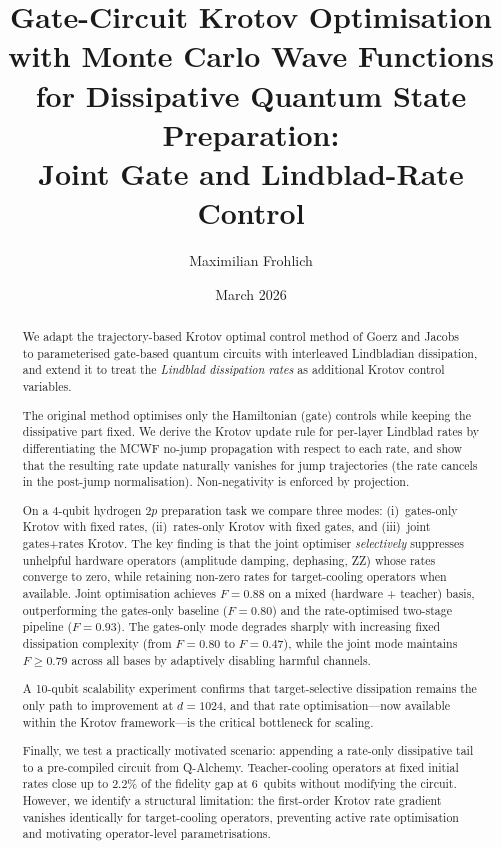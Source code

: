 \documentclass[11pt,a4paper]{article}
\title{Gate-Circuit Krotov Optimisation with Monte Carlo Wave Functions\\
for Dissipative Quantum State Preparation:\\
Joint Gate and Lindblad-Rate Control}
\author{Maximilian Frohlich}
\date{March 2026}
\begin{document}
\maketitle

\begin{abstract}
We adapt the trajectory-based Krotov optimal control method of Goerz and
Jacobs~\cite{goerz2018} to parameterised gate-based quantum circuits with
interleaved Lindbladian dissipation, and extend it to treat the
\emph{Lindblad dissipation rates} as additional Krotov control variables.

The original method optimises only the Hamiltonian (gate) controls while
keeping the dissipative part fixed.  We derive the Krotov update rule for
per-layer Lindblad rates by differentiating the MCWF no-jump propagation
with respect to each rate, and show that the resulting rate update
naturally vanishes for jump trajectories (the rate cancels in the
post-jump normalisation).  Non-negativity is enforced by projection.

On a 4-qubit hydrogen $2p$ preparation task we compare three modes:
(i)~gates-only Krotov with fixed rates, (ii)~rates-only Krotov with
fixed gates, and (iii)~joint gates+rates Krotov.  The key finding is that
the joint optimiser \emph{selectively} suppresses unhelpful hardware
operators (amplitude damping, dephasing, ZZ) whose rates converge to zero,
while retaining non-zero rates for target-cooling operators when available.
Joint optimisation achieves $F = 0.88$ on a mixed (hardware + teacher)
basis, outperforming the gates-only baseline ($F = 0.80$) and the
rate-optimised two-stage pipeline ($F = 0.93$).  The gates-only mode
degrades sharply with increasing fixed dissipation complexity
(from $F = 0.80$ to $F = 0.47$), while the joint mode maintains
$F \ge 0.79$ across all bases by adaptively disabling harmful channels.

A 10-qubit scalability experiment confirms that target-selective
dissipation remains the only path to improvement at $d = 1024$, and that
rate optimisation---now available within the Krotov framework---is the
critical bottleneck for scaling.

Finally, we test a practically motivated scenario: appending a
rate-only dissipative tail to a pre-compiled circuit from Q-Alchemy.
Teacher-cooling operators at fixed initial rates close up to $2.2\%$ of
the fidelity gap at 6~qubits without modifying the circuit.  However,
we identify a structural limitation: the first-order Krotov rate
gradient vanishes identically for target-cooling operators, preventing
active rate optimisation and motivating operator-level parametrisations.
\end{abstract}
\end{document}
